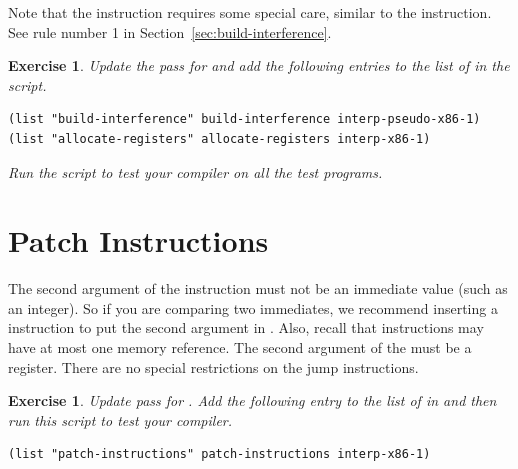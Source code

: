 \documentclass[11pt]{book}
\newtheorem{exercise}[theorem]{Exercise}
\begin{document}
Note that the  instruction requires some special care,
similar to the  instruction. See rule number 1 in
Section~\ref{sec:build-interference}.

\begin{exercise}\normalfont
Update the  pass for \LangXIfVar{} and add the
following entries to the list of  in the
 script.
\begin{lstlisting}
(list "build-interference" build-interference interp-pseudo-x86-1)
(list "allocate-registers" allocate-registers interp-x86-1)
\end{lstlisting}
Run the script to test your compiler on all the \LangIf{} test
programs.
\end{exercise}


\section{Patch Instructions}

The second argument of the  instruction must not be an
immediate value (such as an integer). So if you are comparing two
immediates, we recommend inserting a  instruction to put the
second argument in . Also, recall that instructions may have
at most one memory reference.
%
The second argument of the  must be a register.
%
There are no special restrictions on the jump instructions.

\begin{exercise}\normalfont
%
Update  pass for \LangXIfVar{}.
%  
Add the following entry to the list of  in
 and then run this script to test your compiler.
\begin{lstlisting}
(list "patch-instructions" patch-instructions interp-x86-1)
\end{lstlisting}
\end{exercise}
\end{document}
